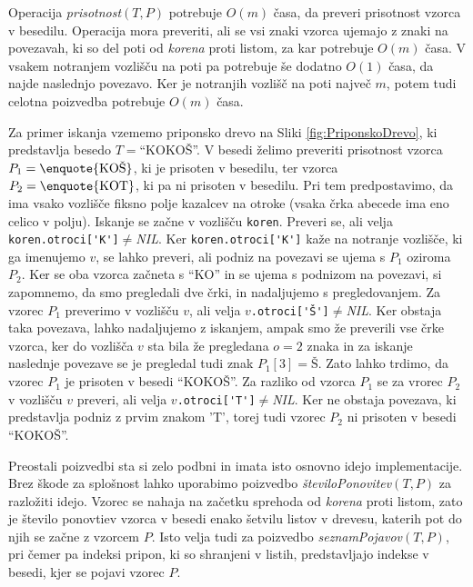 Operacija \textit{prisotnost}$(T,P)$ potrebuje $O(m)$ časa, da preveri prisotnost vzorca v besedilu. Operacija mora preveriti, ali se vsi znaki vzorca ujemajo z znaki na povezavah, ki so del poti od \textit{korena} proti listom, za kar potrebuje $O(m)$ časa. V vsakem notranjem vozlišču na poti pa potrebuje še dodatno $O(1)$ časa, da najde naslednjo povezavo. Ker je notranjih vozlišč na poti največ $m$, potem tudi celotna poizvedba potrebuje $O(m)$ časa.

Za primer iskanja vzememo priponsko drevo na Sliki \ref{fig:PriponskoDrevo}, ki predstavlja besedo $T=$\enquote{KOKOŠ}. V besedi želimo preveriti prisotnost vzorca $P_1=\text{\enquote{KOŠ}}$, ki je prisoten v besedilu, ter vzorca $P_2=\text{\enquote{KOT}}$, ki pa ni prisoten v besedilu. Pri tem predpostavimo, da ima vsako vozlišče fiksno polje kazalcev na otroke (vsaka črka abecede ima eno celico v polju). Iskanje se začne v vozlišču \verb|koren|. Preveri se, ali velja \verb|koren.otroci['K']|$\ne$\textit{NIL}. Ker \verb|koren.otroci['K']| kaže na notranje vozlišče, ki ga imenujemo $v$, se lahko preveri, ali podniz na povezavi se ujema s $P_1$ oziroma $P_2$. Ker se oba vzorca začneta s \enquote{KO} in se ujema s podnizom na povezavi, si zapomnemo, da smo pregledali dve črki, in nadaljujemo s pregledovanjem. Za vzorec $P_1$ preverimo v vozlišču $v$, ali velja $v$\verb|.otroci['Š']|$\ne$\textit{NIL}. Ker obstaja taka povezava, lahko nadaljujemo z iskanjem, ampak smo že preverili vse črke vzorca, ker do vozlišča $v$ sta bila že pregledana $o=2$ znaka in za iskanje naslednje povezave se je pregledal tudi znak $P_1[3]=\text{Š}$. Zato lahko trdimo, da vzorec $P_1$ je prisoten v besedi \enquote{KOKOŠ}. Za razliko od vzorca $P_1$ se za vrorec $P_2$ v vozlišču $v$ preveri, ali velja $v$\verb|.otroci['T']|$\ne$\textit{NIL}. Ker ne obstaja povezava, ki predstavlja podniz z prvim znakom 'T', torej tudi vzorec $P_2$ ni prisoten v besedi \enquote{KOKOŠ}.

Preostali poizvedbi sta si zelo podbni in imata isto osnovno idejo implementacije. Brez škode za splošnost lahko uporabimo poizvedbo \textit{številoPonovitev}$(T,P)$ za razložiti idejo. Vzorec se nahaja na začetku sprehoda od \textit{korena} proti listom, zato je število ponovtiev vzorca v besedi enako šetvilu listov v drevesu, katerih pot do njih se začne z vzorcem $P$. Isto velja tudi za poizvedbo \textit{seznamPojavov}$(T,P)$, pri čemer pa indeksi pripon, ki so shranjeni v listih, predstavljajo indekse v besedi, kjer se pojavi vzorec $P$.

